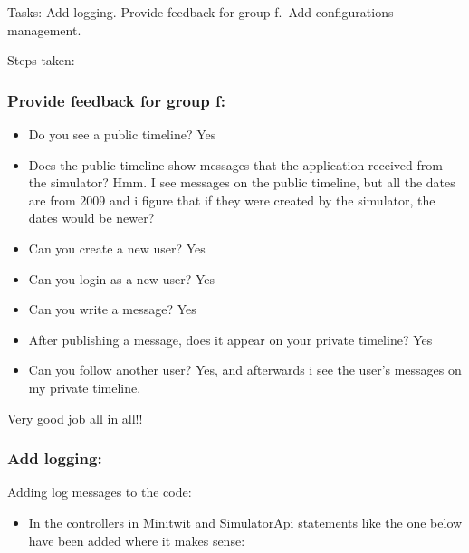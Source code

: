 Tasks: Add logging. Provide feedback for group f.~Add configurations
management.

Steps taken:

\subsubsection{Provide feedback for group f:}
\label{log:provide-feedback-for-group-f}

\begin{itemize}
    \item Do you see a public timeline? Yes
    \item Does the public timeline show messages that the application received from the simulator? Hmm. I see messages on the public timeline, but all the dates are from 2009 and i figure that if they were created by the simulator, the dates would be newer?
    \item Can you create a new user? Yes
    \item Can you login as a new user? Yes
    \item Can you write a message? Yes
    \item After publishing a message, does it appear on your private timeline? Yes
    \item Can you follow another user? Yes, and afterwards i see the user's messages on my private timeline.
\end{itemize}

Very good job all in all!!

\subsubsection{Add logging:}
\label{log:add-logging}

Adding log messages to the code:

\begin{itemize}
    \item In the controllers in Minitwit and SimulatorApi statements like the one below have been added where it makes sense:
\end{itemize}


